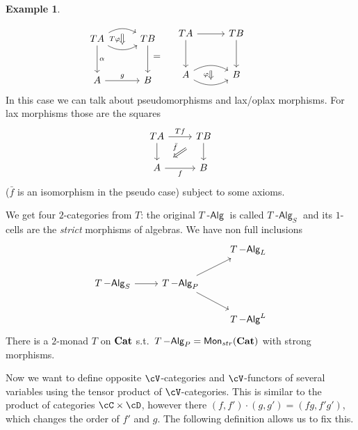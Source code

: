 \documentclass[a4paper,11pt,oneside,openany]{scrbook}
\newcommand{\catname}[1]{{\normalfont\textbf{#1}}}
\DeclareMathOperator{\Alg}{-\mathsf{Alg}}
\newcommand{\Cat}{\catname{Cat}}
\DeclareMathOperator{\Mon}{\mathsf{Mon}}
\theoremstyle{definition}
\theoremstyle{definition}
\newtheorem{exmp}[thm]{Example}
\begin{document}
\begin{exmp}
\begin{enumerate}
\[\begin{minipage}{0.3\linewidth}
\begin{tikzcd}[row sep=1cm, column sep=1cm]
           TA\arrow[d, "\alpha"] \arrow[r, bend right, ""{name=D, anchor=center}] \arrow[r, bend left, ""{name=U, anchor=center}] & TB \arrow[d] \\
 A\arrow[r, "g"]            &B      
      \ar[Rightarrow, shorten <= .3em, shorten >= .3em, "T\varphi"', from=U, to=D]
 \end{tikzcd}
    \end{minipage}
    \hspace{-1.3cm}
            =
	\hspace{.4cm}
	\begin{minipage}{0.3\linewidth}
		\begin{tikzcd}[row sep=1cm, column sep=1cm]
 TA\arrow[d] \arrow[r]                        &  TB\arrow[d] \\
 A\arrow[r, bend right, ""{name=D, anchor=center}] \arrow[r, bend left, ""{name=U, anchor=center}] &      B    
 \ar[Rightarrow, shorten <= .3em, shorten >= .3em, "\varphi"', from=U, to=D]
		\end{tikzcd}
	\end{minipage}
    \]
In this case we can talk about pseudomorphisms and lax/oplax morphisms. For lax morphisms those are the squares
	\[
	\begin{tikzcd}
	TA\arrow[d]\arrow["Tf"]{r}
	& TB\arrow[d] \arrow[dl, Rightarrow, shorten <= 1em, shorten >= 1em, "\bar{f}"']  \\
	A\arrow["f"']{r}
	& B
	\end{tikzcd}
	\]
($\bar{f}$ is an isomorphism in the pseudo case) subject to some axioms. 
\end{enumerate}
\end{exmp}
We get four $2$-categories from $T$: the original $T\Alg$ is called $T\Alg_S$ and its $1$-cells are the \emph{strict} morphisms of algebras. We have non full inclusions
\[
	\begin{tikzcd}
	&& T\Alg_L\\
	T\Alg_S \arrow[r]
	& T\Alg_P \arrow[ur]    \arrow[dr] \\
	&& T\Alg^L
	\end{tikzcd}
	\]
There is a $2$-monad $T$ on $\Cat$ s.t.\ $T\Alg_P=\Mon_{str}(\Cat)$ with strong morphisms. 

Now we want to define opposite $\cV$-categories and $\cV$-functors of several variables using the tensor product of $\cV$-categories. This is similar to the product of categories $\cC\times\cD$, however there $(f,f')\cdot(g,g')=(fg,f'g')$, which changes the order of $f'$ and $g$. The following definition allows us to fix this.
\end{document}
